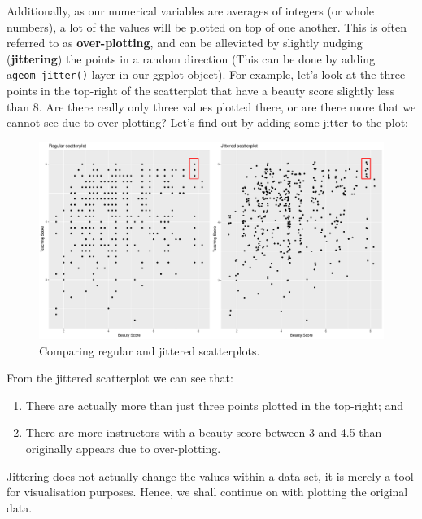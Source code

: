 \documentclass[
  letterpaper,
  DIV=11,
  numbers=noendperiod]{scrartcl}
\providecommand{\tightlist}{%
  \setlength{\itemsep}{0pt}\setlength{\parskip}{0pt}}\usepackage{longtable,booktabs,array}
\begin{document}
Additionally, as our numerical variables are averages of integers (or
whole numbers), a lot of the values will be plotted on top of one
another. This is often referred to as \textbf{over-plotting}, and can be
alleviated by slightly nudging (\textbf{jittering}) the points in a
random direction (This can be done by adding a\texttt{geom\_jitter()}
layer in our ggplot object). For example, let's look at the three points
in the top-right of the scatterplot that have a beauty score slightly
less than 8. Are there really only three values plotted there, or are
there more that we cannot see due to over-plotting? Let's find out by
adding some jitter to the plot:

\begin{figure}[H]

{\centering \includegraphics{index_files/figure-pdf/correlation5-1.pdf}

}

\caption{Comparing regular and jittered scatterplots.}

\end{figure}%

From the jittered scatterplot we can see that:

\begin{enumerate}
\def\labelenumi{\arabic{enumi}.}
\tightlist
\item
  There are actually more than just three points plotted in the
  top-right; and
\item
  There are more instructors with a beauty score between 3 and 4.5 than
  originally appears due to over-plotting.
\end{enumerate}

\begin{tcolorbox}[enhanced jigsaw, leftrule=.75mm, opacityback=0, colbacktitle=quarto-callout-note-color!10!white, left=2mm, rightrule=.15mm, colframe=quarto-callout-note-color-frame, colback=white, coltitle=black, breakable, bottomtitle=1mm, title=\textcolor{quarto-callout-note-color}{\faInfo}\hspace{0.5em}{Note}, toprule=.15mm, titlerule=0mm, toptitle=1mm, bottomrule=.15mm, opacitybacktitle=0.6, arc=.35mm]

Jittering does not actually change the values within a data set, it is
merely a tool for visualisation purposes. Hence, we shall continue on
with plotting the original data.

\end{tcolorbox}
\end{document}
